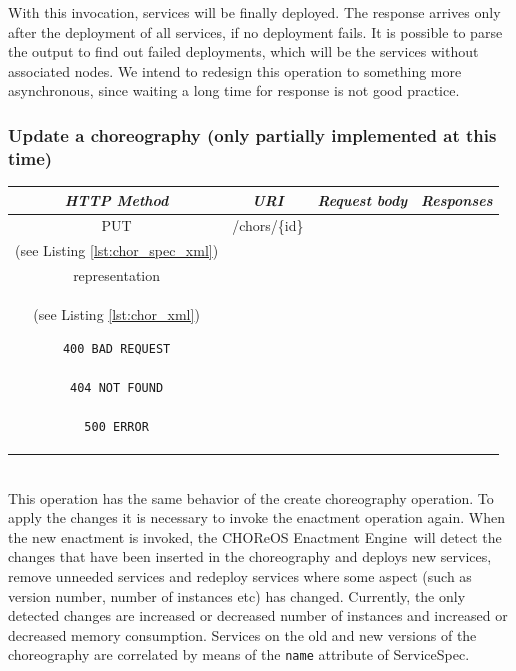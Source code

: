 \documentclass[a4paper, 10pt]{article}
\newcommand{\ee}{CHOReOS Enactment Engine}
\begin{document}
With this invocation, services will be finally deployed.
The response arrives only after the deployment of all services, if no deployment fails.
It is possible to parse the output to find out failed deployments, which will be the services without associated nodes.
We intend to redesign this operation to something more asynchronous, since waiting a long time for response is not good practice.

\subsubsection*{Update a choreography (only partially implemented at this time)}

\begin{tabular}{|c|c|c|c|}
\hline 
\itshape{HTTP Method} & \itshape{URI} & \itshape{Request body} & \itshape{Responses} \\ 
\hline 
PUT & /chors/\{id\} & 

\begin{minipage}{2in}
\verb!ChorSpec! XML representation \\ 
(see Listing \ref{lst:chor_spec_xml})
\end{minipage} 
&
\begin{minipage}{2in}
\begin{verbatim}

200 OK
location = "/chors/{id}"
Body: 
\end{verbatim}
\verb!Choreography! XML \\
representation \\
(see Listing \ref{lst:chor_xml})
\begin{verbatim}
400 BAD REQUEST

404 NOT FOUND

500 ERROR

\end{verbatim}
\end{minipage} 
\\ 
\hline 
\end{tabular} \\

This operation has the same behavior of the create choreography operation.
To apply the changes it is necessary to invoke the enactment operation again.
When the new enactment is invoked, the \ee\ will detect the changes that have
been inserted in the choreography and deploys new services, remove unneeded services and redeploy
services where some aspect (such as version number, number of instances etc) has changed.
Currently, the only detected changes are increased or decreased number of instances
and increased or decreased memory consumption. Services on the old and new versions
of the choreography are correlated by means of the \texttt{name} attribute of ServiceSpec.
\end{document}
